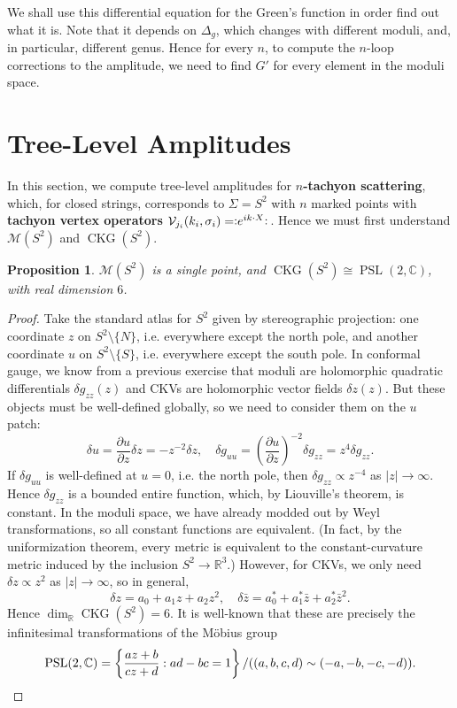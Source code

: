\documentclass{report}
\theoremstyle{plain}
\newtheorem{proposition}[theorem]{Proposition}
\theoremstyle{definition}
\theoremstyle{remark}
\newcommand{\NO}[1]{\vcentcolon\mathrel{#1}\vcentcolon\,}
\newcommand{\bC}{\mathbb{C}}
\newcommand{\bR}{\mathbb{R}}
\newcommand{\cM}{\mathcal{M}}
\newcommand{\cV}{\mathcal{V}}
\DeclareMathOperator{\PSL}{PSL}
\DeclareMathOperator{\CKG}{CKG}
\newcommand{\pder}[2]{\frac{\partial #1}{\partial #2}}
\newcommand{\bz}{\bar{z}}
\begin{document}
We shall use this differential equation for the Green's function in
order find out what it is. Note that it depends on $\Delta_g$, which
changes with different moduli, and, in particular, different genus.
Hence for every $n$, to compute the $n$-loop corrections to the
amplitude, we need to find $G'$ for every element in the moduli space.

\section{Tree-Level Amplitudes}

In this section, we compute tree-level amplitudes for {\bf $n$-tachyon
  scattering}, which, for closed strings, corresponds to $\Sigma =
S^2$ with $n$ marked points with {\bf tachyon vertex operators}
$\cV_{j_i}(k_i, \sigma_i) = \NO{e^{ik\cdot X}}$. Hence we must first
understand $\cM(S^2)$ and $\CKG(S^2)$.

\begin{proposition}
  $\cM(S^2)$ is a single point, and $\CKG(S^2) \cong \PSL(2, \bC)$,
  with real dimension $6$.
\end{proposition}

\begin{proof}
  Take the standard atlas for $S^2$ given by stereographic projection:
  one coordinate $z$ on $S^2 \setminus \{N\}$, i.e. everywhere except
  the north pole, and another coordinate $u$ on $S^2 \setminus \{S\}$,
  i.e. everywhere except the south pole. In conformal gauge, we know
  from a previous exercise that moduli are holomorphic quadratic
  differentials $\delta g_{zz}(z)$ and CKVs are holomorphic vector
  fields $\delta z(z)$. But these objects must be well-defined
  globally, so we need to consider them on the $u$ patch:
  \[ \delta u = \pder{u}{z} \delta z = -z^{-2} \delta z, \quad \delta g_{uu} = \left(\pder{u}{z}\right)^{-2} \delta g_{zz} = z^4 \delta g_{zz}. \]
  If $\delta g_{uu}$ is well-defined at $u = 0$, i.e. the north pole,
  then $\delta g_{zz} \propto z^{-4}$ as $|z| \to \infty$. Hence
  $\delta g_{zz}$ is a bounded entire function, which, by Liouville's
  theorem, is constant. In the moduli space, we have already modded
  out by Weyl transformations, so all constant functions are
  equivalent. (In fact, by the uniformization theorem, every metric is
  equivalent to the constant-curvature metric induced by the inclusion
  $S^2 \to \bR^3$.) However, for CKVs, we only need $\delta z \propto
  z^2$ as $|z| \to \infty$, so in general,
  \[ \delta z = a_0 + a_1z + a_2z^2, \quad \delta \bz = a_0^* + a_1^*\bz + a_2^*\bz^2. \]
  Hence $\dim_{\bR} \CKG(S^2) = 6$. It is well-known that these are
  precisely the infinitesimal transformations of the M\"obius group
  \[ \PSL(2, \bC) = \left\{\frac{az+b}{cz+d} : ad - bc = 1\right\}/((a, b, c, d) \sim (-a, -b, -c, -d)). \qedhere \]
\end{proof}
\end{document}
